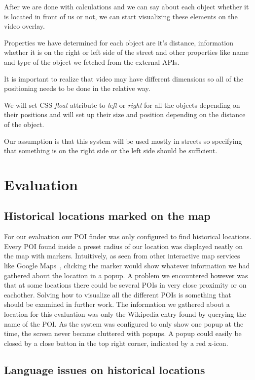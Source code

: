 \documentclass[journal]{IEEEtran}
\begin{document}
After we are done with calculations and we can say about each object whether it is located in front of us or not, we can start visualizing these elements on the video overlay.

Properties we have determined for each object are it's distance, information whether it is on the right or left side of the street and other properties like name and type of the object we fetched from the external APIs.

It is important to realize that video may have different dimensions so all of the positioning needs to be done in the relative way.

We will set CSS \textit{float} attribute to \textit{left} or \textit{right} for all the objects depending on their positions and will set up their size and position depending on the distance of the object.

Our assumption is that this system will be used mostly in streets so specifying that something is on the right side or the left side should be sufficient.

\section{Evaluation}

\subsection{Historical locations marked on the map}
For our evaluation our POI finder was only configured to find historical locations. Every POI found inside a preset radius of our location was displayed neatly on the map with markers. Intuitively, as seen from other interactive map services like Google Maps~\cite{google-maps}, clicking the marker would show whatever information we had gathered about the location in a popup. A problem we encountered however was that at some locations there could be several POIs in very close proximity or on eachother. Solving how to visualize all the different POIs is something that should be examined in further work. The information we gathered about a location for this evaluation was only the Wikipedia entry found by querying the name of the POI. As the system was configured to only show one popup at the time, the screen never became cluttered with popups. A popup could easily be closed by a close button in the top right corner, indicated by a red x-icon.

\subsection{Language issues on historical locations}
\end{document}
